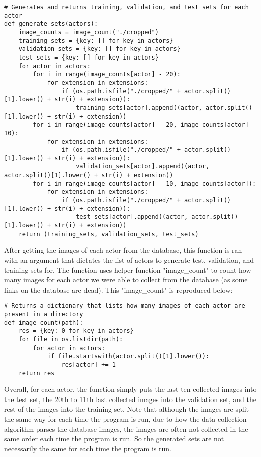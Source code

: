 \documentclass[11pt,a4paper]{report}
\begin{document}
\begin{lstlisting}
# Generates and returns training, validation, and test sets for each actor
def generate_sets(actors):
    image_counts = image_count("./cropped")
    training_sets = {key: [] for key in actors}
    validation_sets = {key: [] for key in actors}
    test_sets = {key: [] for key in actors}
    for actor in actors:
        for i in range(image_counts[actor] - 20):
            for extension in extensions:
                if (os.path.isfile("./cropped/" + actor.split()[1].lower() + str(i) + extension)):
                    training_sets[actor].append((actor, actor.split()[1].lower() + str(i) + extension))
        for i in range(image_counts[actor] - 20, image_counts[actor] - 10):
            for extension in extensions:
                if (os.path.isfile("./cropped/" + actor.split()[1].lower() + str(i) + extension)):
                    validation_sets[actor].append((actor, actor.split()[1].lower() + str(i) + extension))
        for i in range(image_counts[actor] - 10, image_counts[actor]):
            for extension in extensions:
                if (os.path.isfile("./cropped/" + actor.split()[1].lower() + str(i) + extension)):
                    test_sets[actor].append((actor, actor.split()[1].lower() + str(i) + extension))
    return (training_sets, validation_sets, test_sets)
\end{lstlisting}	

After getting the images of each actor from the database, this function is ran with an argument that dictates the list of actors to generate test, validation, and training sets for. The function uses helper function "image\_count" to count how many images for each actor we were able to collect from the database (as some links on the database are dead). This "image\_count" is reproduced below:

\begin{lstlisting}
# Returns a dictionary that lists how many images of each actor are present in a directory
def image_count(path):
    res = {key: 0 for key in actors}
    for file in os.listdir(path):
        for actor in actors:
            if file.startswith(actor.split()[1].lower()):
                res[actor] += 1
    return res
\end{lstlisting}

Overall, for each actor, the function simply puts the last ten collected images into the test set, the 20th to 11th last collected images into the validation set, and the rest of the images into the training set. Note that although the images are split the same way for each time the program is run, due to how the data collection algorithm parses the database images, the images are often not collected in the same order each time the program is run. So the generated sets are not necessarily the same for each time the program is run.
\end{document}

